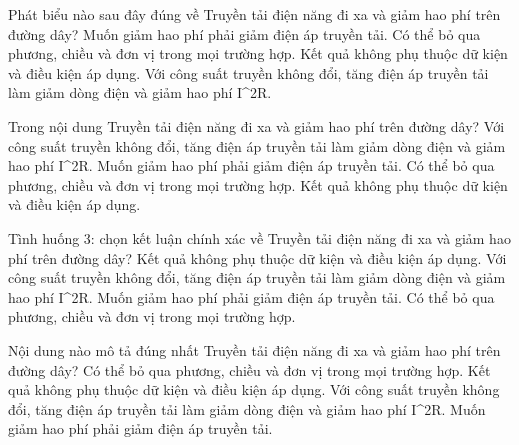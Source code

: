 \begin{ex}
Phát biểu nào sau đây đúng về Truyền tải điện năng đi xa và giảm hao phí trên đường dây?
\choice
{Muốn giảm hao phí phải giảm điện áp truyền tải.}
{Có thể bỏ qua phương, chiều và đơn vị trong mọi trường hợp.}
{Kết quả không phụ thuộc dữ kiện và điều kiện áp dụng.}
{\True Với công suất truyền không đổi, tăng điện áp truyền tải làm giảm dòng điện và giảm hao phí I^2R.}
\end{ex}

\begin{ex}
Trong nội dung Truyền tải điện năng đi xa và giảm hao phí trên đường dây?
\choice
{\True Với công suất truyền không đổi, tăng điện áp truyền tải làm giảm dòng điện và giảm hao phí I^2R.}
{Muốn giảm hao phí phải giảm điện áp truyền tải.}
{Có thể bỏ qua phương, chiều và đơn vị trong mọi trường hợp.}
{Kết quả không phụ thuộc dữ kiện và điều kiện áp dụng.}
\end{ex}

\begin{ex}
Tình huống 3: chọn kết luận chính xác về Truyền tải điện năng đi xa và giảm hao phí trên đường dây?
\choice
{Kết quả không phụ thuộc dữ kiện và điều kiện áp dụng.}
{\True Với công suất truyền không đổi, tăng điện áp truyền tải làm giảm dòng điện và giảm hao phí I^2R.}
{Muốn giảm hao phí phải giảm điện áp truyền tải.}
{Có thể bỏ qua phương, chiều và đơn vị trong mọi trường hợp.}
\end{ex}

\begin{ex}
Nội dung nào mô tả đúng nhất Truyền tải điện năng đi xa và giảm hao phí trên đường dây?
\choice
{Có thể bỏ qua phương, chiều và đơn vị trong mọi trường hợp.}
{Kết quả không phụ thuộc dữ kiện và điều kiện áp dụng.}
{\True Với công suất truyền không đổi, tăng điện áp truyền tải làm giảm dòng điện và giảm hao phí I^2R.}
{Muốn giảm hao phí phải giảm điện áp truyền tải.}
\end{ex}

